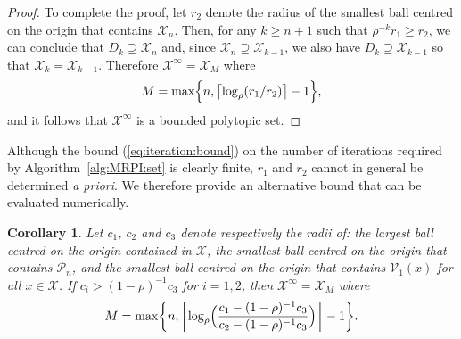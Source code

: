 \documentclass[journal]{IEEEtran}
\newcommand{\todo}[2]{%
  \providetoggle{#1}%
    \iftoggle{#1}{%
    {\color{red}#2}%
    }{#2}%
}
\newcounter{thmcount}
\newtheorem{cor}[thmcount]{Corollary}
\theoremstyle{remark}
\theoremstyle{definition}
\begin{document}
\begin{proof}
To complete the proof, let $r_2$ denote the radius of the smallest ball centred on the origin that contains $\mathcal X_n$.
%
Then, for any $k\geq n+1$ such that 
$\rho^{-k} r_1 \geq r_2$, 
we can conclude that $D_k\supseteq \mathcal X_n$ and, since $\mathcal X_n \supseteq \mathcal X_{k-1}$, we also have $D_k\supseteq \mathcal X_{k-1}$ so that 
$\mathcal X_k = \mathcal{X}_{k-1}$.
%
Therefore $\mathcal X^\infty = \mathcal X_M$ where
\begin{equation}\label{eq:iteration:bound}
M = \max \Bigl\{ n , \todo{Mark:log:bounds}{\bigl\lceil 
\log_{\rho}(r_1/r_2)\bigr\rceil -1}\Bigr\},
\end{equation}
and it follows that $\mathcal{X}^\infty$ is a bounded polytopic set.
\end{proof}
%

Although the bound (\ref{eq:iteration:bound}) on the number of iterations required by Algorithm~\ref{alg:MRPI:set} is clearly finite, $r_1$ and $r_2$ cannot in general be determined \textit{a priori}. 
%
We therefore provide an alternative bound that can be evaluated numerically. 

\begin{cor}
Let $c_1$, $c_2$ and $c_3$ denote respectively the radii of: %
the largest ball centred on the origin contained in $\mathcal{X}$, 
%
the smallest ball centred on the origin that contains $\mathcal{P}_n$, and
%
the smallest ball centred on the origin that contains $\mathcal{V}_1(x)$ for all $x\in\mathcal{X}$.
%
If $c_i > (1-\rho)^{-1}c_3$ for $i=1,2$, then $\mathcal X^\infty = \mathcal X_M$ where
\begin{equation}\label{eq:iteration:cbound}
M = \max \biggl\{ n , 
\todo{Mark:log:bounds}{
\biggl\lceil \log_{\rho}\Bigl(\frac{c_1-(1-\rho)^{-1}c_3}{c_2-(1-\rho)^{-1}c_3}\Bigr)\biggr\rceil -1 \biggr\}}.
\end{equation}
\end{cor}
%
\end{document}

